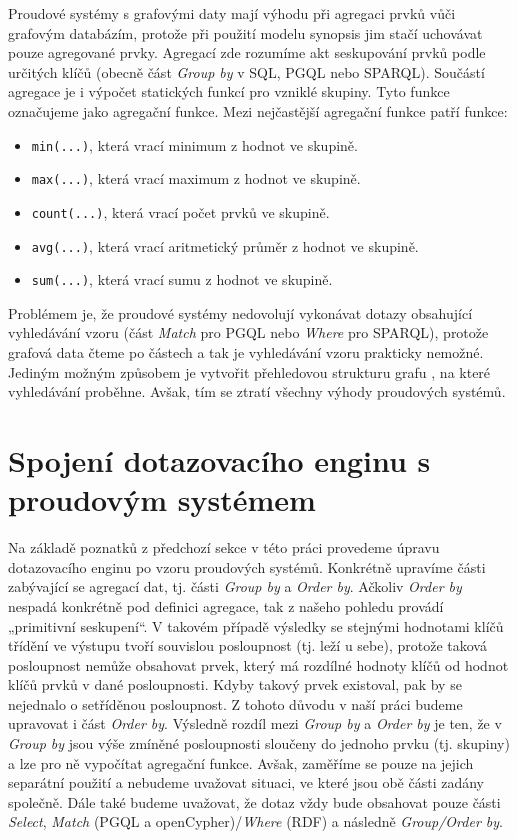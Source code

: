 Proudové systémy s grafovými daty mají výhodu při agregaci prvků vůči grafovým databázím, protože při použití modelu synopsis jim stačí uchovávat pouze agregované prvky. 
Agregací zde rozumíme akt seskupování prvků podle určitých klíčů (obecně část \textit{Group by} v SQL, PGQL nebo SPARQL).
Součástí agregace je i výpočet statických funkcí pro vzniklé skupiny.
Tyto funkce označujeme jako agregační funkce.
Mezi nejčastější agregační funkce patří funkce:
\begin{itemize} 
\item \texttt{min(...)}, která vrací minimum z hodnot ve skupině.
\item \texttt{max(...)}, která vrací maximum z hodnot ve skupině.
\item \texttt{count(...)}, která vrací počet prvků ve skupině.
\item \texttt{avg(...)}, která vrací aritmetický průměr z hodnot ve skupině.
\item \texttt{sum(...)}, která vrací sumu z hodnot ve skupině.
\end{itemize}
Problémem je, že proudové systémy nedovolují vykonávat dotazy obsahující vyhledávání vzoru (část \textit{Match} pro PGQL nebo \textit{Where} pro SPARQL), protože grafová data čteme po částech a tak je vyhledávání vzoru prakticky nemožné.
Jediným možným způsobem je vytvořit přehledovou strukturu grafu \citep{graphsummary}, na které vyhledávání proběhne.
Avšak, tím se ztratí všechny výhody proudových systémů.

\section*{Spojení dotazovacího enginu s proudovým systémem}

Na základě poznatků z předchozí sekce v této práci provedeme úpravu dotazovacího enginu po vzoru proudových systémů.
Konkrétně upravíme části zabývající se agregací dat, tj. části \textit{Group by} a \textit{Order by}.
Ačkoliv \textit{Order by} nespadá konkrétně pod definici agregace, tak z našeho pohledu provádí „primitivní seskupení“.
V takovém případě výsledky se stejnými hodnotami klíčů třídění ve výstupu tvoří souvislou posloupnost (tj. leží u sebe), protože taková posloupnost nemůže obsahovat prvek, který má rozdílné hodnoty klíčů od hodnot klíčů prvků v dané posloupnosti.
Kdyby takový prvek existoval, pak by se nejednalo o setříděnou posloupnost.   
Z tohoto důvodu v naší práci budeme upravovat i část \textit{Order by}.
Výsledně rozdíl mezi \textit{Group by} a \textit{Order by} je ten, že v \textit{Group by} jsou výše zmíněné posloupnosti sloučeny do jednoho prvku (tj. skupiny) a lze pro ně vypočítat agregační funkce. 
Avšak, zaměříme se pouze na jejich separátní použití a nebudeme uvažovat situaci, ve které jsou obě části zadány společně.
Dále také budeme uvažovat, že dotaz vždy bude obsahovat pouze části \textit{Select}, \textit{Match} (PGQL a openCypher)/\textit{Where} (RDF) a následně \textit{Group/Order by}.

